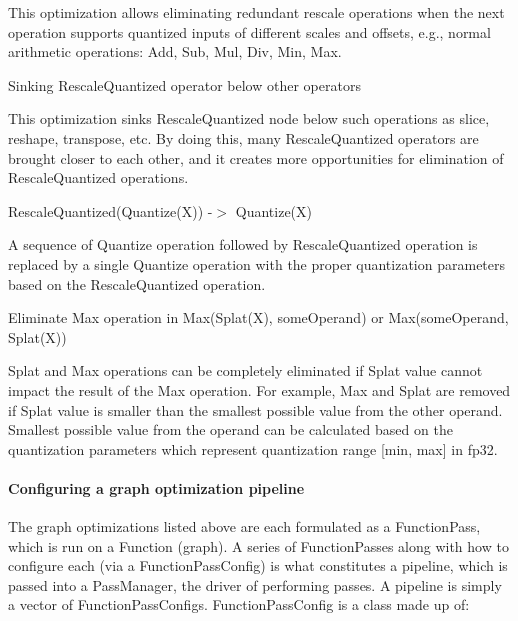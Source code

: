 \begin{DoxyItemize}
This optimization allows eliminating redundant rescale operations when the next operation supports quantized inputs of different scales and offsets, e.\+g., normal arithmetic operations\+: Add, Sub, Mul, Div, Min, Max.
\item Sinking Rescale\+Quantized operator below other operators

This optimization sinks Rescale\+Quantized node below such operations as slice, reshape, transpose, etc. By doing this, many Rescale\+Quantized operators are brought closer to each other, and it creates more opportunities for elimination of Rescale\+Quantized operations.
\item Rescale\+Quantized(\+Quantize(\+X)) -\/$>$ Quantize(\+X)

A sequence of Quantize operation followed by Rescale\+Quantized operation is replaced by a single Quantize operation with the proper quantization parameters based on the Rescale\+Quantized operation.
\item Eliminate Max operation in Max(\+Splat(\+X), some\+Operand) or Max(some\+Operand, Splat(\+X))

Splat and Max operations can be completely eliminated if Splat value cannot impact the result of the Max operation. For example, Max and Splat are removed if Splat value is smaller than the smallest possible value from the other operand. Smallest possible value from the operand can be calculated based on the quantization parameters which represent quantization range \mbox{[}min, max\mbox{]} in fp32.
\end{DoxyItemize}

\paragraph*{Configuring a graph optimization pipeline}

The graph optimizations listed above are each formulated as a Function\+Pass, which is run on a Function (graph). A series of Function\+Passes along with how to configure each (via a {\ttfamily Function\+Pass\+Config}) is what constitutes a pipeline, which is passed into a Pass\+Manager, the driver of performing passes. A pipeline is simply a vector of {\ttfamily Function\+Pass\+Config}s. {\ttfamily Function\+Pass\+Config} is a class made up of\+:


